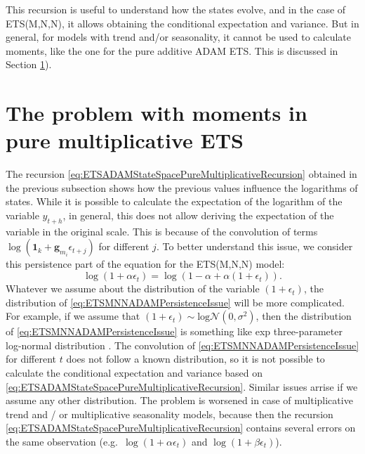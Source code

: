 \documentclass[]{book}
\theoremstyle{definition}
\theoremstyle{definition}
\theoremstyle{definition}
\theoremstyle{definition}
\theoremstyle{remark}
\begin{document}
This recursion is useful to understand how the states evolve, and in the case of ETS(M,N,N), it allows obtaining the conditional expectation and variance. But in general, for models with trend and/or seasonality, it cannot be used to calculate moments, like the one for the pure additive ADAM ETS. This is discussed in Section \ref{pureMultiplicativeExpectationAndVariance}).

\hypertarget{pureMultiplicativeExpectationAndVariance}{%
\section{The problem with moments in pure multiplicative ETS}\label{pureMultiplicativeExpectationAndVariance}}

The recursion \eqref{eq:ETSADAMStateSpacePureMultiplicativeRecursion} obtained in the previous subsection shows how the previous values influence the logarithms of states. While it is possible to calculate the expectation of the logarithm of the variable \(y_{t+h}\), in general, this does not allow deriving the expectation of the variable in the original scale. This is because of the convolution of terms \(\log(\mathbf{1}_k + \mathbf{g}_{m_i} \epsilon_{t+j})\) for different \(j\). To better understand this issue, we consider this persistence part of the equation for the ETS(M,N,N) model:
\begin{equation}
    \log(1+\alpha\epsilon_t) = \log(1-\alpha + \alpha(1+\epsilon_t)).
  \label{eq:ETSMNNADAMPersistenceIssue}
\end{equation}
Whatever we assume about the distribution of the variable \((1+\epsilon_t)\), the distribution of \eqref{eq:ETSMNNADAMPersistenceIssue} will be more complicated. For example, if we assume that \((1+\epsilon_t)\sim\mathrm{log}\mathcal{N}(0,\sigma^2)\), then the distribution of \eqref{eq:ETSMNNADAMPersistenceIssue} is something like exp three-parameter log-normal distribution \citep{Sangal1970}. The convolution of \eqref{eq:ETSMNNADAMPersistenceIssue} for different \(t\) does not follow a known distribution, so it is not possible to calculate the conditional expectation and variance based on \eqref{eq:ETSADAMStateSpacePureMultiplicativeRecursion}. Similar issues arrise if we assume any other distribution. The problem is worsened in case of multiplicative trend and / or multiplicative seasonality models, because then the recursion \eqref{eq:ETSADAMStateSpacePureMultiplicativeRecursion} contains several errors on the same observation (e.g.~\(\log(1+\alpha\epsilon_t)\) and \(\log(1+\beta\epsilon_t)\)).
\end{document}

